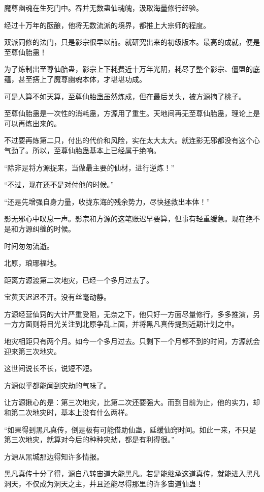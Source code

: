 \begin{this_body}
魔尊幽魂在生死门中。吞并无数蛊仙魂魄，汲取海量修行经验。

经过十万年的酝酿，他将无数流派的境界，都推上大宗师的程度。

双派同修的法门，只是影宗很早以前。就研究出来的初级版本。最高的成就，便是至尊仙胎蛊！

为了炼制出至尊仙胎蛊，影宗上下耗费近十万年光阴，耗尽了整个影宗、僵盟的底蕴，甚至搭上了魔尊幽魂本体，才堪堪功成。

可是人算不如天算，至尊仙胎蛊虽然炼成，但在最后关头，被方源摘了桃子。

至尊仙胎蛊是一次性的消耗蛊，方源用了重生。天地间再无至尊仙胎蛊，理论上是可以再炼出来的。

不过要再炼第二只，付出的代价和风险，实在太大太大。就连影无邪都没有这个心气劲了。所以，至尊仙胎蛊基本上已经属于绝响。

“除非是将方源捉来，当做最主要的仙材，进行逆炼！”

“不过，现在还不是对付他的时候。”

“还是先增强自身力量，收拢东海的残余势力，尽快拯救出本体！”

影无邪心中叹息一声。影宗和方源的这笔账迟早要算，但事有轻重缓急。现在绝不是和方源纠缠的时候。

时间匆匆流逝。

北原，琅琊福地。

距离方源渡第二次地灾，已经一个多月过去了。

宝黄天迟迟不开。没有丝毫动静。

方源经营仙窍的大计严重受阻，无奈之下，他只好一方面尽量修行，多多推演，另一方方面则将目光关注到北原争乱上面，并将黑凡真传提到近期计划之中。

地灾相距只有两个月。如今一个多月过去。只剩下一个月都不到的时间，方源就会迎来第三次地灾。

这世间说长不长，说短不短。

方源似乎都能闻到灾劫的气味了。

让方源揪心的是：第三次地灾，比第二次还要强大。而到目前为止，他的实力，却和第二次地灾时，基本上没有什么两样。

“如果得到黑凡真传，倒是极有可能借助仙蛊，延缓仙窍时间。如此一来，不只是第三次地灾，就算对今后的种种灾劫，都是有利得很。”

方源从黑城那边得知许多情报。

黑凡真传十分了得，源自八转宙道大能黑凡。若是能继承这道真传，就能进入黑凡洞天，不仅成为洞天之主，并且还能尽得那里的许多宙道仙蛊！


\end{this_body}
